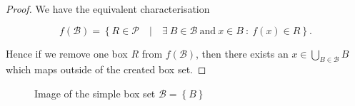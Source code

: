 \begin{proof}
    We have the equivalent characterisation

    \begin{equation}
        f(\mathcal{B}) = \left\{
            R \in \mathcal{P} \quad \vert \quad
            \exists\ B \in \mathcal{B}\ \text{and}\ x \in B\ :\ f(x) \in R
        \right\}.
    \end{equation}

    Hence if we remove one box $R$ from $f(\mathcal{B})$, then there exists an 
    $x \in \bigcup_{B \in \mathcal{B}} B$ which maps outside of the created box set.

\end{proof}

\begin{figure}[ht]
    \caption{Image of the simple box set $\mathcal{B} = \left\{ B \right\}$}
    \label{fig:boximage}
\end{figure} \newpage